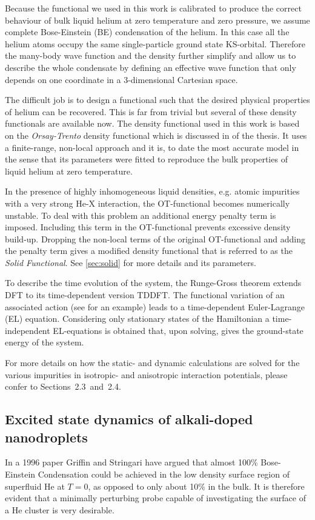 		Because the functional we used in this work is calibrated to produce the correct behaviour of bulk liquid helium at zero temperature and zero pressure, we assume complete Bose-Einstein (BE) condensation of the helium. In this case all the helium atoms occupy the same single-particle ground state KS-orbital. Therefore the many-body wave function and the density further simplify and allow us to describe the whole condensate by defining an effective wave function that only depends on one coordinate in a 3-dimensional Cartesian space. 
		
		The difficult job is to design a functional such that the desired physical properties of helium can be recovered. This is far from trivial but several of these density functionals are available now. The density functional used in this work is based on the \emph{Orsay-Trento} density functional which is discussed in  of the thesis. It uses a finite-range, non-local approach and it is, to date the most accurate model in the sense that its parameters were fitted to reproduce the bulk properties of liquid helium at zero temperature.
		
		In the presence of highly inhomogeneous liquid densities, e.g. atomic impurities with a very strong He-X interaction, the OT-functional becomes numerically unstable. To deal with this problem an additional energy penalty term is imposed. Including this term in the OT-functional prevents excessive density build-up. Dropping the non-local terms of the original OT-functional and adding the penalty term gives a modified density functional that is referred to as the \emph{Solid Functional}. See \ref{sec:solid} for more details and its parameters.
		
		To describe the time evolution of the system, the Runge-Gross theorem extends DFT to its time-dependent version TDDFT\citep{Run84}. The functional variation of an associated action (see  for an example) leads to a time-dependent Euler-Lagrange (EL) equation. Considering only stationary states of the Hamiltonian a time-independent EL-equations is obtained that, upon solving, gives the ground-state energy of the system.
		
		For more details on how the static- and dynamic calculations are solved for the various impurities in isotropic- and anisotropic interaction potentials, please confer to Sections~2.3~and~2.4.
		
	\subsection*{Excited state dynamics of alkali-doped nanodroplets}
		In a 1996 paper\citep{Griffin1996} Griffin and Stringari have argued that almost 100\% Bose-Einstein Condensation could be achieved in the low density surface region of superfluid He at $T=0$, as opposed to only about 10\% in the bulk. It is therefore evident that a minimally perturbing probe capable of investigating the surface of a He cluster is very desirable.


